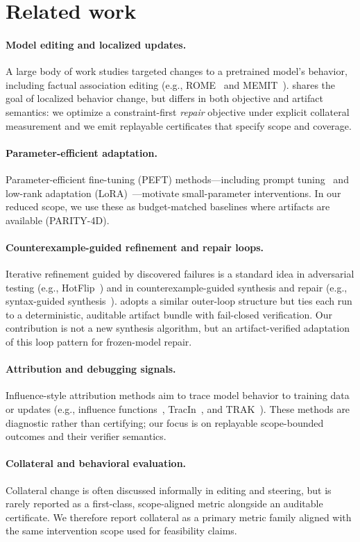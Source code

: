 \section{Related work}
\label{sec:related}

\paragraph{Model editing and localized updates.}
A large body of work studies targeted changes to a pretrained model's behavior, including factual association editing (e.g., ROME~\cite{meng2022rome} and MEMIT~\cite{meng2023memit}).
\Method shares the goal of localized behavior change, but differs in both objective and artifact semantics: we optimize a constraint-first \emph{repair} objective under explicit collateral measurement and we emit replayable certificates that specify scope and coverage.

\paragraph{Parameter-efficient adaptation.}
Parameter-efficient fine-tuning (PEFT) methods---including prompt tuning~\cite{lester2021prompt} and low-rank adaptation (LoRA)~\cite{hu2022lora}---motivate small-parameter interventions.
In our reduced scope, we use these as budget-matched baselines where artifacts are available (PARITY-4D).

\paragraph{Counterexample-guided refinement and repair loops.}
Iterative refinement guided by discovered failures is a standard idea in adversarial testing (e.g., HotFlip~\cite{ebrahimi2018hotflip}) and in counterexample-guided synthesis and repair (e.g., syntax-guided synthesis~\cite{alur2013syntax}).
\Method adopts a similar outer-loop structure but ties each run to a deterministic, auditable artifact bundle with fail-closed verification.
Our contribution is not a new synthesis algorithm, but an artifact-verified adaptation of this loop pattern for frozen-model repair.

\paragraph{Attribution and debugging signals.}
Influence-style attribution methods aim to trace model behavior to training data or updates (e.g., influence functions~\cite{koh2017influence}, TracIn~\cite{pruthi2020tracin}, and TRAK~\cite{park2023trak}).
These methods are diagnostic rather than certifying; our focus is on replayable scope-bounded outcomes and their verifier semantics.

\paragraph{Collateral and behavioral evaluation.}
Collateral change is often discussed informally in editing and steering, but is rarely reported as a first-class, scope-aligned metric alongside an auditable certificate.
We therefore report collateral as a primary metric family aligned with the same intervention scope used for feasibility claims.
